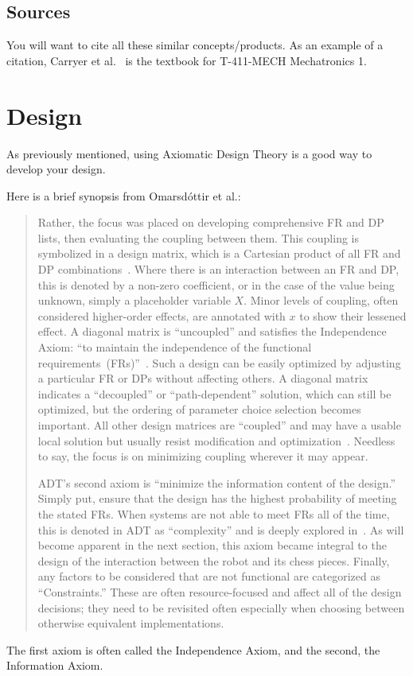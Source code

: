 \documentclass[draft]{ipfwreport}
\begin{document}
\subsection*{Sources}
You will want to cite all these similar concepts/products.
As an example of a citation, Carryer et al.~\cite{carryer2011IntroMechatronics} is the textbook for T-411-MECH Mechatronics 1.


\section{Design}
As previously mentioned, using Axiomatic Design Theory is a good way to develop your design.

Here is a brief synopsis from Omarsdóttir et al.\cite{omarsdottir2016chessmate}:
\begin{quotation}
  Rather, the focus was placed on developing comprehensive FR and DP lists, then evaluating the coupling between them.
  This coupling is symbolized in a design matrix, which is a Cartesian product of all FR and DP combinations~\cite{cochran2016msdd, benevides2012aed}.
Where there is an interaction between an FR and DP, this is denoted by a non-zero coefficient, or in the case of the value being unknown, simply a placeholder variable $X$.
Minor levels of coupling, often considered higher-order effects, are annotated with $x$ to show their lessened effect.
A diagonal matrix is ``uncoupled'' and satisfies the Independence Axiom: ``to maintain the independence of the functional requirements~(FRs)''~\cite{suh2001axiomatic}.
Such a design can be easily optimized by adjusting a particular FR or DPs without affecting others.
A diagonal matrix indicates a ``decoupled'' or ``path-dependent'' solution, which can still be optimized, but the ordering of parameter choice selection becomes important.
All other design matrices are ``coupled'' and may have a usable local solution but usually resist modification and optimization~\cite{suh2001axiomatic}.
Needless to say, the focus is on minimizing coupling wherever it may appear.

ADT's second axiom is ``minimize the information content of the design.''
Simply put, ensure that the design has the highest probability of meeting the stated FRs.
When systems are not able to meet FRs all of the time, this is denoted in ADT as ``complexity'' and is deeply explored in~\cite{suh2005complexity}.
As will become apparent in the next section, this axiom became integral to the design of the interaction between the robot and its chess pieces.
Finally, any factors to be considered that are not functional are categorized as ``Constraints.''
These are often resource-focused and affect all of the design decisions; they need to be revisited often especially when choosing between otherwise equivalent implementations.
\end{quotation}
The first axiom is often called the Independence Axiom, and the second, the Information Axiom.
\end{document}

